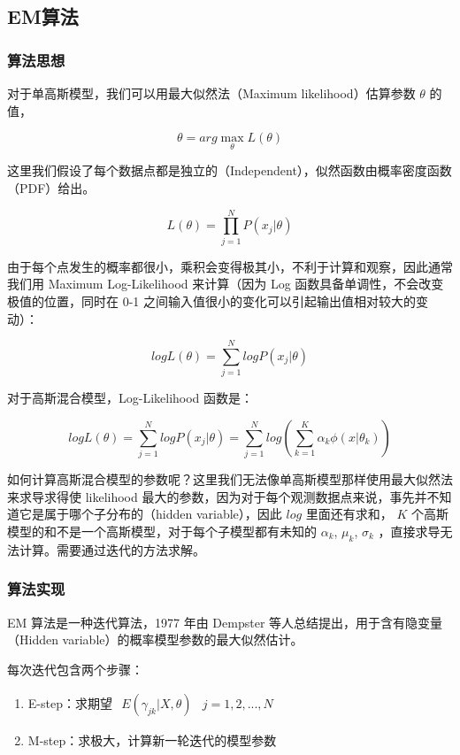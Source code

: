 \documentclass{ML}
\begin{document}
\subsection{EM算法}

\subsubsection{算法思想}

对于单高斯模型，我们可以用最大似然法（Maximum likelihood）估算参数 $\theta$ 的值，

$$\theta = arg \max_{\theta} L(\theta)$$

这里我们假设了每个数据点都是独立的（Independent），似然函数由概率密度函数（PDF）给出。

$$L(\theta) = \prod_{j=1}^{N}P(x_{j}|\theta)$$

由于每个点发生的概率都很小，乘积会变得极其小，不利于计算和观察，因此通常我们用 Maximum Log-Likelihood 来计算（因为 Log 函数具备单调性，不会改变极值的位置，同时在 0-1 之间输入值很小的变化可以引起输出值相对较大的变动）：

$$logL(\theta) = \sum_{j=1}^{N}{logP(x_{j}|\theta)}$$

对于高斯混合模型，Log-Likelihood 函数是：

$$logL(\theta) = \sum_{j=1}^{N}{logP(x_{j}|\theta)} = \sum_{j=1}^{N}{log(\sum_{k=1}^{K}{\alpha_{k}\phi(x|\theta_{k})})}$$

如何计算高斯混合模型的参数呢？这里我们无法像单高斯模型那样使用最大似然法来求导求得使 likelihood 最大的参数，因为对于每个观测数据点来说，事先并不知道它是属于哪个子分布的（hidden variable），因此 $log$ 里面还有求和， $K$ 个高斯模型的和不是一个高斯模型，对于每个子模型都有未知的 $\alpha_{k}$, $\mu_{k}$, $\sigma_{k}$ ，直接求导无法计算。需要通过迭代的方法求解。

\subsubsection{算法实现}

EM 算法是一种迭代算法，1977 年由 Dempster 等人总结提出，用于含有隐变量（Hidden variable）的概率模型参数的最大似然估计。

每次迭代包含两个步骤：

\begin{enumerate}
	\item E-step：求期望 $\begin{array}{ll} E(\gamma_{jk} | X, \theta) & j = 1,2,...,N \end{array}$
	\item M-step：求极大，计算新一轮迭代的模型参数
\end{enumerate}
\end{document}
